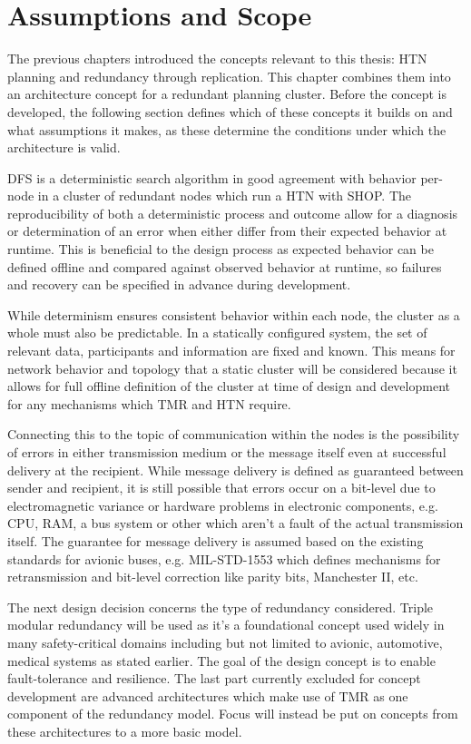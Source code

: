\section{Assumptions and Scope}

The previous chapters introduced the concepts relevant to this thesis: HTN planning and redundancy through replication. This chapter combines them into an architecture concept for a redundant planning cluster. Before the concept is developed, the following section defines which of these concepts it builds on and what assumptions it makes, as these determine the conditions under which the architecture is valid.

DFS is a deterministic search algorithm in good agreement with behavior per-node in a cluster of redundant nodes which run a HTN with SHOP. The reproducibility of both a deterministic process and outcome allow for a diagnosis or determination of an error when either differ from their expected behavior at runtime. This is beneficial to the design process as expected behavior can be defined offline and compared against observed behavior at runtime, so failures and recovery can be specified in advance during development.

While determinism ensures consistent behavior within each node, the cluster as a whole must also be predictable. In a statically configured system, the set of relevant data, participants and information are fixed and known. This means for network behavior and topology that a static cluster will be considered because it allows for full offline definition of the cluster at time of design and development for any mechanisms which TMR and HTN require.

Connecting this to the topic of communication within the nodes is the possibility of errors in either transmission medium or the message itself even at successful delivery at the recipient. While message delivery is defined as guaranteed between sender and recipient, it is still possible that errors occur on a bit-level due to electromagnetic variance or hardware problems in electronic components, e.g. CPU, RAM, a bus system or other which aren't a fault of the actual transmission itself. The guarantee for message delivery is assumed based on the existing standards for avionic buses, e.g. MIL-STD-1553 \parencite{milstd1553c} which defines mechanisms for retransmission and bit-level correction like parity bits, Manchester II, etc.

The next design decision concerns the type of redundancy considered. Triple modular redundancy will be used as it's a foundational concept used widely in many safety-critical domains including but not limited to avionic, automotive, medical systems as stated earlier. The goal of the design concept is to enable fault-tolerance and resilience. The last part currently excluded for concept development are advanced architectures \parencite{bonna_triple_2019, anwer_dynamic_2020, hamilton_adaptive-hybrid_2019} which make use of TMR as one component of the redundancy model. Focus will instead be put on concepts from these architectures to a more basic model.

